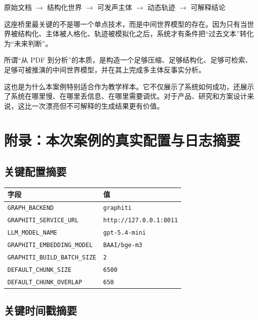 \documentclass[UTF8,10pt,oneside]{ctexbook}
\newcommand{\code}[1]{\nolinkurl{#1}}
\begin{document}
\begin{center}
\Large
原始文档 $\rightarrow$ 结构化世界 $\rightarrow$ 可发声主体 $\rightarrow$ 动态轨迹 $\rightarrow$ 可解释结论
\end{center}

这座桥里最关键的不是哪一个单点技术，而是中间世界模型的存在。因为只有当世界被结构化、主体被人格化、轨迹被模拟化之后，系统才有条件把“过去文本”转化为“未来判断”。

\begin{definitionbox}[最终定义]
所谓“从 PDF 到分析”的本质，是构造一个足够压缩、足够结构化、足够可检索、足够可被推演的中间世界模型，并在其上完成多主体反事实分析。
\end{definitionbox}

这也是为什么本案例特别适合作为教学样本。它不仅展示了系统如何成功，还展示了系统在哪里慢、在哪里丢信息、在哪里需要调优。对于产品、研究和方案设计来说，这比一次漂亮但不可解释的生成结果更有价值。

\backmatter

\appendix

\chapter{附录：本次案例的真实配置与日志摘要}

\section{关键配置摘要}

\begin{table}[H]
\centering
\small
\begin{tabularx}{\textwidth}{p{4.2cm}X}
\toprule
字段 & 值 \\
\midrule
\code{GRAPH\_BACKEND} & \code{graphiti} \\
\code{GRAPHITI\_SERVICE\_URL} & \code{http://127.0.0.1:8011} \\
\code{LLM\_MODEL\_NAME} & \code{gpt-5.4-mini} \\
\code{GRAPHITI\_EMBEDDING\_MODEL} & \code{BAAI/bge-m3} \\
\code{GRAPHITI\_BUILD\_BATCH\_SIZE} & \code{2} \\
\code{DEFAULT\_CHUNK\_SIZE} & \code{6500} \\
\code{DEFAULT\_CHUNK\_OVERLAP} & \code{650} \\
\bottomrule
\end{tabularx}
\end{table}

\section{关键时间戳摘要}
\end{document}
